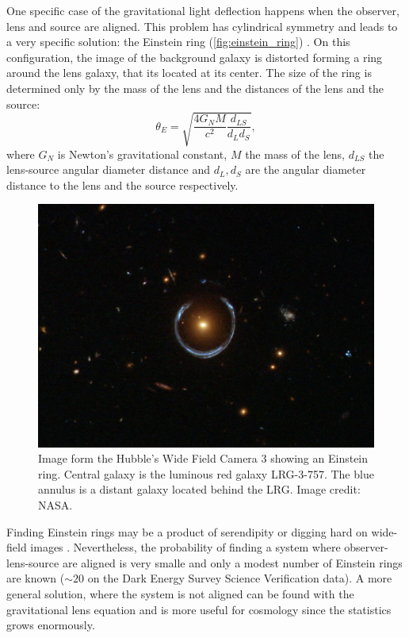 One specific case of the gravitational light deflection happens when the observer, lens and source are aligned. This problem has cylindrical symmetry and leads to a very specific solution: the Einstein ring (\autoref{fig:einstein_ring}) \cite{2016ApJ...827...51N}. On this configuration, the image of the background galaxy is distorted forming a ring around the lens galaxy, that its located at its center. The size of the ring is determined only by the mass of the lens and the distances of the lens and the source:
\begin{equation}
\theta_E = \sqrt{\frac{4G_NM}{c^2}\frac{d_{LS}}{d_Ld_S}},
\end{equation}
where $G_N$ is Newton's gravitational constant, $M$ the mass of the lens, $d_{LS}$ the lens-source angular diameter distance and $d_L,d_S$ are the angular diameter distance to the lens and the source respectively.
\begin{figure}
\begin{center}
\includegraphics[width=\textwidth]{./Pictures/einstein_ring.jpg}
\caption{Image form the Hubble's Wide Field Camera 3 showing an Einstein ring. Central galaxy is the luminous red galaxy LRG-3-757. The blue annulus is a distant galaxy located behind the LRG. Image credit: NASA.}
\label{fig:einstein_ring}
\end{center}
\end{figure}
\newline

Finding Einstein rings may be a product of serendipity or digging hard on wide-field images \cite{2017arXiv170402744J}. Nevertheless, the probability of finding a system where observer-lens-source are aligned is very smalle and only a modest number of Einstein rings are known ($\sim20$ on the Dark Energy Survey Science Verification data). A more general solution, where the system is not aligned can be found with the gravitational lens equation and is more useful for cosmology since the statistics grows enormously.


